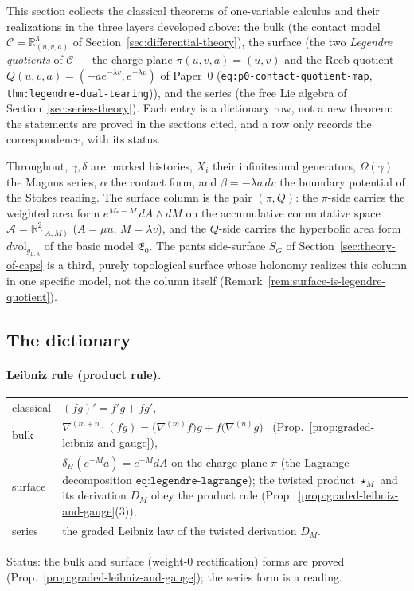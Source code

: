 
This section collects the classical theorems of one-variable calculus and their
realizations in the three layers developed above: the bulk (the contact model
$\mathcal C=\mathbb R^3_{(u,v,a)}$ of Section~\ref{sec:differential-theory}), the
surface (the two \emph{Legendre quotients} of $\mathcal C$ --- the charge plane
$\pi(u,v,a)=(u,v)$ and the Reeb quotient
$Q(u,v,a)=(-ae^{-\lambda v},e^{-\lambda v})$ of Paper~0
(\texttt{eq:p0-contact-quotient-map}, \texttt{thm:legendre-dual-tearing})), and
the series (the free Lie algebra of Section~\ref{sec:series-theory}).  Each
entry is a dictionary row, not a new theorem: the statements are proved in the
sections cited, and a row only records the correspondence, with its status.

Throughout, $\gamma,\delta$ are marked histories, $X_i$ their infinitesimal
generators, $\Omega(\gamma)$ the Magnus series, $\alpha$ the contact form, and
$\beta=-\lambda a\,dv$ the boundary potential of the Stokes reading.
The surface column is the pair $(\pi,Q)$: the $\pi$-side carries the weighted
area form $e^{M_*-M}\,dA\wedge dM$ on the accumulative commutative space
$\mathcal A=\mathbb R^2_{(A,M)}$ ($A=\mu u$, $M=\lambda v$), and the $Q$-side
carries the hyperbolic area form $d\mathrm{vol}_{g_{\mu,\lambda}}$ of the basic
model $\mathfrak E_0$.  The pants side-surface $S_G$ of
Section~\ref{sec:theory-of-caps} is a third, purely topological surface whose
holonomy realizes this column in one specific model, not the column itself
(Remark~\ref{rem:surface-is-legendre-quotient}).

\subsection{The dictionary}

\paragraph{Leibniz rule (product rule).} \hfill
\begin{center}
\begin{tabular}{lp{}}
classical & $(fg)'=f'g+fg'$,\\[2pt]
bulk & $\nabla^{(m+n)}(fg)=\bigl(\nabla^{(m)}f\bigr)g+f\bigl(\nabla^{(n)}g\bigr)$
  \ (Prop.~\ref{prop:graded-leibniz-and-gauge}),\\[2pt]
surface & $\delta_H(e^{-M}a)=e^{-M}dA$ on the charge plane $\pi$
  (the Lagrange decomposition $\texttt{eq:legendre-lagrange}$); the twisted
  product $\star_M$ and its derivation $D_M$ obey the product rule
  (Prop.~\ref{prop:graded-leibniz-and-gauge}(3)),\\[2pt]
series & the graded Leibniz law of the twisted derivation $D_M$.
\end{tabular}
\end{center}
{\small Status: the bulk and surface (weight-0 rectification) forms are proved
(Prop.~\ref{prop:graded-leibniz-and-gauge}); the series form is a reading.}

